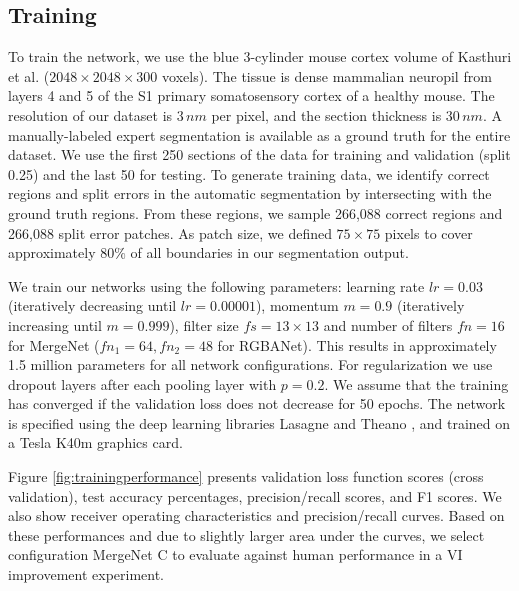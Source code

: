 \subsection{Training}
To train the network, we use the blue 3-cylinder mouse cortex volume of Kasthuri et al. \cite{kasthuri2015saturated} ($2048\times2048\times300$ voxels). The tissue is dense mammalian neuropil from layers 4 and 5 of the S1 primary somatosensory cortex of a healthy mouse. The resolution of our dataset is $3\, nm$ per pixel, and the section thickness is $30\, nm$. 
A manually-labeled expert segmentation is available as a ground truth for the entire dataset. We use the first 250 sections of the data for training and validation (split 0.25) and the last 50 for testing. To generate training data, we identify correct regions and split errors in the automatic segmentation by intersecting with the ground truth regions. From these regions, we sample 266,088 correct regions and 266,088 split error patches. As patch size, we defined $75\times75$ pixels to cover approximately $80\%$ of all boundaries in our segmentation output. 
%



We train our networks using the following parameters: learning rate $lr=0.03$ (iteratively decreasing until $lr=0.00001$), momentum $m=0.9$ (iteratively increasing until $m=0.999$), filter size $fs=13\times13$ and number of filters $fn=16$ for MergeNet ($fn_1=64, fn_2=48$ for RGBANet). This results in approximately 1.5 million parameters for all network configurations. For regularization we use dropout layers after each pooling layer with $p=0.2$. We assume that the training has converged if the validation loss does not decrease for 50 epochs. The network is specified using the deep learning libraries Lasagne and Theano \cite{Bastien-Theano-2012}, and trained on a Tesla K40m graphics card.

Figure \ref{fig:trainingperformance} presents validation loss function scores (cross validation), test accuracy percentages, precision/recall scores, and F1 scores. We also show receiver operating characteristics and precision/recall curves. Based on these performances and due to slightly larger area under the curves, we select configuration MergeNet C to evaluate against human performance in a VI improvement experiment. 







